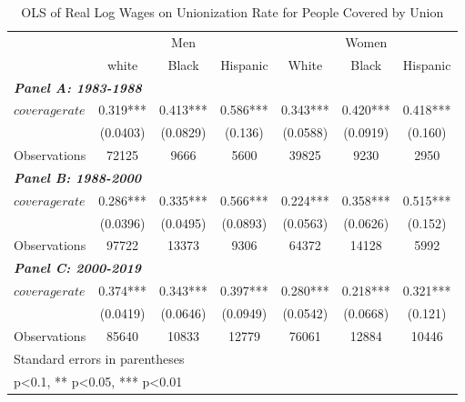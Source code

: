 \begin{table}[h!]\centering
\def\sym#1{\ifmmode^{#1}\else\(^{#1}\)\fi}
\caption{OLS of Real Log Wages on Unionization Rate for People Covered by Union}\label{tab:ulincovrate}
\begin{tabular}{l*{6}{c}}
\hline
&\multicolumn{3}{c}{Men}                        &\multicolumn{3}{c}{Women}                      \\\cmidrule(lr){2-4}\cmidrule(lr){5-7}
&\multicolumn{1}{c}{white}&\multicolumn{1}{c}{Black}&\multicolumn{1}{c}{Hispanic}&\multicolumn{1}{c}{White}&\multicolumn{1}{c}{Black}&\multicolumn{1}{c}{Hispanic}\\
\hline
\multicolumn{3}{l}{\linebreak \textbf{\textit{Panel A: 1983-1988}}} \\
$ coveragerate $    &       0.319***&       0.413***&       0.586***&       0.343***&       0.420***&       0.418***\\
&    (0.0403)   &    (0.0829)   &     (0.136)   &    (0.0588)   &    (0.0919)   &     (0.160)   \\
\hline
Observations        &       72125   &        9666   &        5600   &       39825   &        9230   &        2950   \\
\hline
\multicolumn{3}{l}{\linebreak \textbf{\textit{Panel B: 1988-2000}}} \\
$ coveragerate $    &       0.286***&       0.335***&       0.566***&       0.224***&       0.358***&       0.515***\\
&    (0.0396)   &    (0.0495)   &    (0.0893)   &    (0.0563)   &    (0.0626)   &     (0.152)   \\
\hline
Observations        &       97722   &       13373   &        9306   &       64372   &       14128   &        5992   \\
\hline
\multicolumn{3}{l}{\linebreak \textbf{\textit{Panel C: 2000-2019}}} \\
$ coveragerate $    &       0.374***&       0.343***&       0.397***&       0.280***&       0.218***&       0.321***\\
&    (0.0419)   &    (0.0646)   &    (0.0949)   &    (0.0542)   &    (0.0668)   &     (0.121)   \\
\hline
Observations        &       85640   &       10833   &       12779   &       76061   &       12884   &       10446   \\
\hline\hline
\multicolumn{7}{l}{\footnotesize Standard errors in parentheses}\\
\multicolumn{7}{l}{\footnotesize * p<0.1, ** p<0.05, *** p<0.01}\\
\end{tabular}
\end{table}
